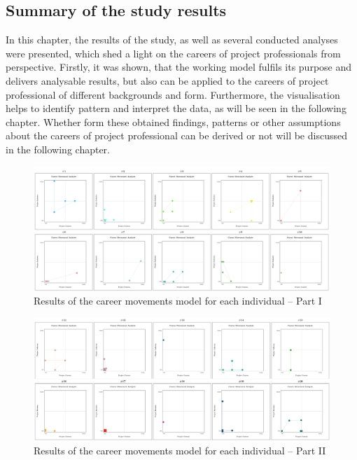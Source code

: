 \subsection{Summary of the study results}
In this chapter, the results of the study, as well as several conducted analyses were presented, which shed a light on the careers of project professionals from perspective. Firstly, it was shown, that the working model fulfils its purpose and delivers analysable results, but also can be applied to the careers of project professional of different backgrounds and form. Furthermore, the visualisation helps to identify pattern and interpret the data, as will be seen in the following chapter. Whether form these obtained findings,  patterns or other assumptions about the careers of project professional can be derived or not will be discussed in the following chapter.  \\

\begin{figure}
    \captionsetup{font=small}
  \centering
  \includegraphics[width=1.0\columnwidth]{figures/Analysis_CM1.png}
  \caption[Results of the career movements model for each individual – Part I]{Results of the career movements model for each individual – Part I}
  \label{fig:CM1}
\end{figure}

\begin{figure}
    \captionsetup{font=small}
  \centering
  \includegraphics[width=1.0\columnwidth]{figures/Analysis_CM2.png}
  \caption[Results of the career movements model for each individual – Part II]{Results of the career movements model for each individual – Part II}
  \label{fig:CM2}
\end{figure}